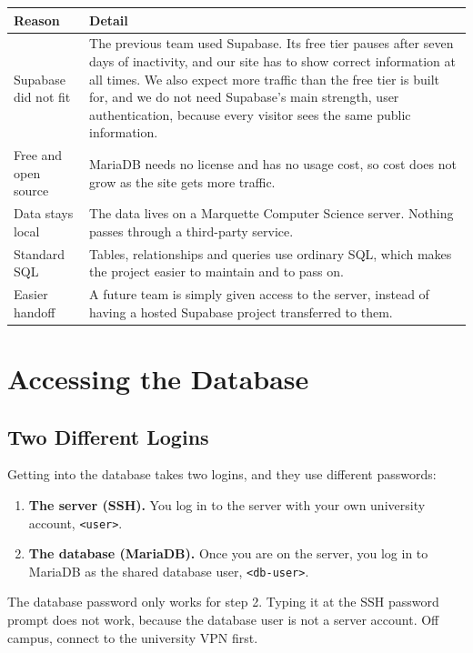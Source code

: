 \documentclass[11pt]{article}
\newcommand{\code}[1]{\texttt{#1}}
\begin{document}
\begin{tabular}{|L{1.5in}|L{3.9in}|}
\hline
\textbf{Reason} & \textbf{Detail} \\
\hline
Supabase did not fit &
The previous team used Supabase. Its free tier pauses after seven days of
inactivity, and our site has to show correct information at all times.
We also expect more traffic than the free tier is built for, and we do not
need Supabase's main strength, user authentication, because every visitor
sees the same public information. \\
\hline
Free and open source &
MariaDB needs no license and has no usage cost, so cost does not grow as
the site gets more traffic. \\
\hline
Data stays local &
The data lives on a Marquette Computer Science server. Nothing passes
through a third-party service. \\
\hline
Standard SQL &
Tables, relationships and queries use ordinary SQL, which makes the
project easier to maintain and to pass on. \\
\hline
Easier handoff &
A future team is simply given access to the server, instead of having a
hosted Supabase project transferred to them. \\
\hline
\end{tabular}

\section{Accessing the Database}

\subsection{Two Different Logins}

Getting into the database takes two logins, and they use different
passwords:

\begin{enumerate}
  \item \textbf{The server (SSH).} You log in to the server with your own
  university account, \code{<user>}.
  \item \textbf{The database (MariaDB).} Once you are on the server, you log
  in to MariaDB as the shared database user, \code{<db-user>}.
\end{enumerate}

The database password only works for step 2. Typing it at the SSH password
prompt does not work, because the database user is not a server account.
Off campus, connect to the university VPN first.
\end{document}
